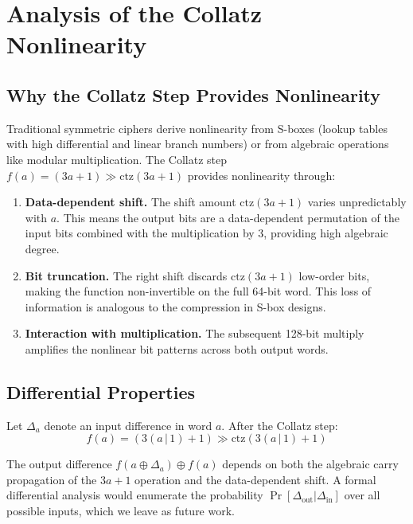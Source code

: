 \documentclass[11pt,a4paper]{article}
\newcommand{\ctz}{\mathrm{ctz}}
\begin{document}
\section{Analysis of the Collatz Nonlinearity}
\label{sec:analysis}

\subsection{Why the Collatz Step Provides Nonlinearity}

Traditional symmetric ciphers derive nonlinearity from S-boxes (lookup
tables with high differential and linear branch numbers) or from
algebraic operations like modular multiplication. The Collatz step
$f(a) = (3a+1) \gg \ctz(3a+1)$ provides nonlinearity through:

\begin{enumerate}
    \item \textbf{Data-dependent shift.} The shift amount
          $\ctz(3a+1)$ varies unpredictably with $a$. This means the
          output bits are a data-dependent permutation of the input bits
          combined with the multiplication by 3, providing high algebraic
          degree.
    \item \textbf{Bit truncation.} The right shift discards
          $\ctz(3a+1)$ low-order bits, making the function non-invertible
          on the full 64-bit word. This loss of information is analogous
          to the compression in S-box designs.
    \item \textbf{Interaction with multiplication.} The subsequent
          128-bit multiply amplifies the nonlinear bit patterns across
          both output words.
\end{enumerate}

\subsection{Differential Properties}

Let $\Delta_a$ denote an input difference in word $a$. After the
Collatz step:
$$f(a) = (3(a \,|\, 1) + 1) \gg \ctz(3(a \,|\, 1) + 1)$$

The output difference $f(a \oplus \Delta_a) \oplus f(a)$ depends on
both the algebraic carry propagation of the $3a+1$ operation and the
data-dependent shift. A formal differential analysis would enumerate
the probability $\Pr[\Delta_{\mathrm{out}} | \Delta_{\mathrm{in}}]$
over all possible inputs, which we leave as future work.
\end{document}
